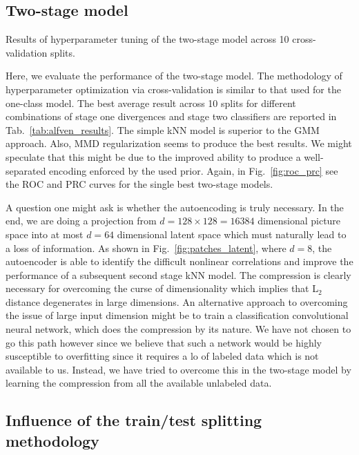 \subsection{Two-stage model}

\begin{table}
\centering

\caption{Results of hyperparameter tuning of the two-stage model across 10 cross-validation splits.}
\label{tab:alfven_results}
\end{table}

Here, we evaluate the performance of the two-stage model. The methodology of hyperparameter optimization via cross-validation is similar to that used for the one-class model.  The best average result across 10 splits for different combinations of stage one divergences and stage two classifiers are reported in Tab.~\ref{tab:alfven_results}. The simple kNN model is superior to the GMM approach. Also, MMD regularization seems to produce the best results. We might speculate that this might be due to the improved ability to produce a well-separated encoding enforced by the used prior. Again, in Fig.~\ref{fig:roc_prc} see the ROC and PRC curves for the single best two-stage models.

A question one might ask is whether the autoencoding is truly necessary. In the end, we are doing a projection from $d=128\times128=16384$ dimensional picture space into at most $d=64$ dimensional latent space which must naturally lead to a loss of information. As shown in Fig.~\ref{fig:patches_latent}, where $d=8$, the autoencoder is able to identify the difficult nonlinear correlations and improve the performance of a subsequent second stage kNN model. The compression is clearly necessary for overcoming the curse of dimensionality which implies that L$_2$ distance degenerates in large dimensions. An alternative approach to overcoming the issue of large input dimension might be to train a classification convolutional neural network, which does the compression by its nature. We have not chosen to go this path however since we believe that such a network would be highly susceptible to overfitting since it requires a lo of labeled data which is not available to us. Instead, we have tried to overcome this in the two-stage model by learning the compression from all the available unlabeled data.

\subsection{Influence of the train/test splitting methodology}

